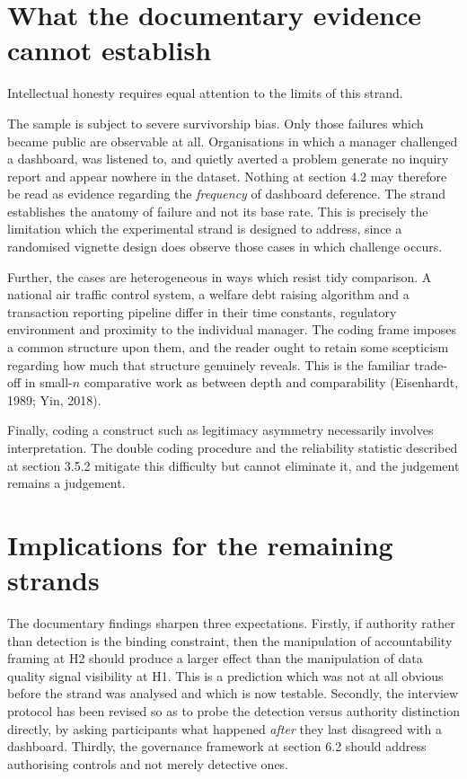 \documentclass[12pt,a4paper]{article}
\begin{document}
\section{What the documentary evidence cannot establish}

Intellectual honesty requires equal attention to the limits of this strand.

The sample is subject to severe survivorship bias. Only those failures which became public are observable
at all. Organisations in which a manager challenged a dashboard, was listened to, and quietly averted a
problem generate no inquiry report and appear nowhere in the dataset. Nothing at section 4.2 may therefore
be read as evidence regarding the \emph{frequency} of dashboard deference. The strand establishes the
anatomy of failure and not its base rate. This is precisely the limitation which the experimental strand is
designed to address, since a randomised vignette design does observe those cases in which challenge occurs.

Further, the cases are heterogeneous in ways which resist tidy comparison. A national air traffic
control system, a welfare debt raising algorithm and a transaction reporting pipeline differ in
their time constants, regulatory environment and proximity to the individual manager. The coding
frame imposes a common structure upon them, and the reader ought to retain some scepticism
regarding how much that structure genuinely reveals. This is the familiar trade-off in small-$n$
comparative work as between depth and comparability (Eisenhardt, 1989; Yin, 2018).

Finally, coding a construct such as legitimacy asymmetry necessarily involves interpretation. The double
coding procedure and the reliability statistic described at section 3.5.2 mitigate this difficulty but
cannot eliminate it, and the judgement remains a judgement.

\section{Implications for the remaining strands}

The documentary findings sharpen three expectations. Firstly, if authority rather than detection is the
binding constraint, then the manipulation of accountability framing at H2 should produce a larger effect
than the manipulation of data quality signal visibility at H1. This is a prediction which was not at all
obvious before the strand was analysed and which is now testable. Secondly, the interview protocol has been
revised so as to probe the detection versus authority distinction directly, by asking participants what
happened \emph{after} they last disagreed with a dashboard. Thirdly, the governance framework at section
6.2 should address authorising controls and not merely detective ones.
\end{document}
